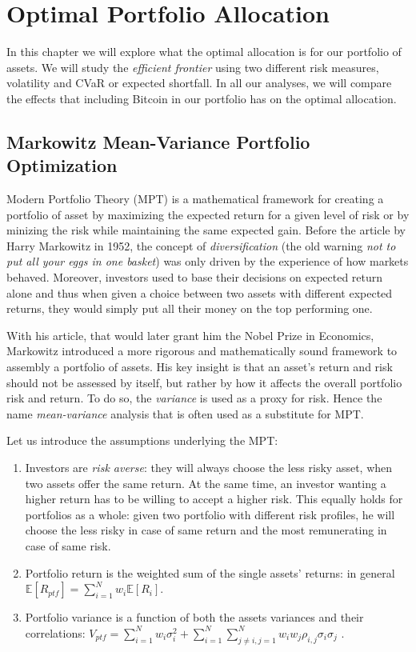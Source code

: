 \chapter{Optimal Portfolio Allocation}
\label{chpr:markowitz}

In this chapter we will explore what the optimal allocation is for our portfolio of assets. We will study the \textit{efficient frontier} using two different risk measures, volatility and CVaR or expected shortfall. In all our analyses, we will compare the effects that including Bitcoin in our portfolio has on the optimal allocation.


\section{Markowitz Mean-Variance Portfolio Optimization}
\label{sec:markowitz_theory}

Modern Portfolio Theory (MPT) is a mathematical framework for creating a portfolio of asset by maximizing the expected return for a given level of risk or by minizing the risk while maintaining the same expected gain. 
Before the article \citep{MARKOWITZ1952} by Harry Markowitz in 1952, the concept of \textit{diversification} (the old warning \textit{not to put all your eggs in one basket}) was only driven by the experience of how markets behaved.
Moreover, investors used to base their decisions on expected return alone and thus when given a choice between two assets with different expected returns, they would simply  put all their money on the top performing one.

With his article, that would later grant him the Nobel Prize in Economics, Markowitz introduced a more rigorous and mathematically sound framework to assembly a portfolio of assets. His key insight is that an asset's return and risk  should not be assessed by itself, but rather by how it affects the overall portfolio risk and return.
To do so, the \textit{variance} is used as a proxy for risk. Hence the name \textit{mean-variance } analysis that is often used as a substitute for MPT.

\bigskip
Let us introduce the assumptions underlying the MPT:
\begin{enumerate}
	\item Investors are \textit{risk averse}: they will always choose the less risky asset, when two assets offer the same return.  At the same time, an investor wanting a higher return has to be willing to accept a higher risk.
	This equally holds for portfolios as a whole: given two portfolio with different risk profiles, he will choose the less risky in case of same return and the most remunerating in case of same risk.
	\item Portfolio return is the weighted sum of the single assets' returns: in general $\mathbb{E}[R_{ptf}] = \sum_{i=1}^{N} w_i \mathbb{E}[R_i]$.
	\item Portfolio variance is a function of both the assets variances and their correlations: $V_{ptf} = \sum_{i=1}^{N} w_i \sigma_i^2 + \sum_{i=1}^{N}\sum_{j\neq i , j=1}^{N} w_i w_j \rho_{i,j}\sigma_i\sigma_j$ .
\end{enumerate}

